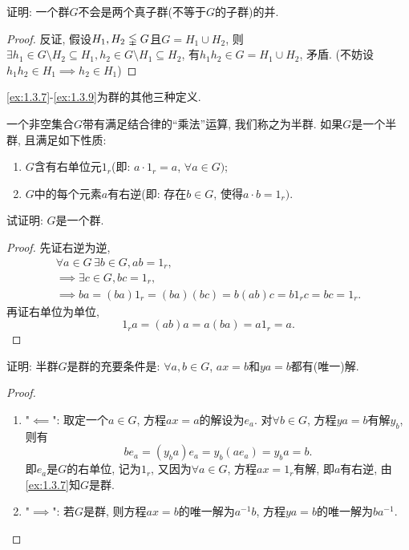 \begin{problem}
    证明: 一个群$G$不会是两个真子群(不等于$G$的子群)的并.
\end{problem}

\begin{proof}
    反证, 假设$H_1, H_2 \lvertneqq G$且$G = H_1 \cup H_2$, 则$\exists h_1 \in G \setminus H_2 \subseteq H_1, h_2 \in G \setminus H_1 \subseteq H_2$, 有$h_1h_2 \in G = H_1 \cup H_2$, 矛盾. (不妨设$h_1h_2 \in H_1 \implies h_2 \in H_1$)
\end{proof}

\ref{ex:1.3.7}-\ref{ex:1.3.9}为群的其他三种定义.

\begin{problem}\label{ex:1.3.7}
    一个非空集合$G$带有满足结合律的“乘法”运算, 我们称之为半群. 如果$G$是一个半群, 且满足如下性质:
    \begin{enumerate}[(1)]
        \item $G$含有右单位元$1_r$(即: $a \cdot 1_r = a$, $\forall a \in G)$;
        \item $G$中的每个元素$a$有右逆(即: 存在$b \in G$, 使得$a \cdot b = 1_r)$.
    \end{enumerate}
    试证明: $G$是一个群.
\end{problem}

\begin{proof}
    先证右逆为逆,
    \[
    \begin{gathered}
        \forall a \in G \, \exists b \in G, ab = 1_r,\\
        \implies \exists c \in G, bc = 1_r,\\
        \implies ba = (ba)1_r = (ba)(bc) = b(ab)c = b1_rc = bc = 1_r.
    \end{gathered}
    \]
    再证右单位为单位,
    \[
        1_ra = (ab)a = a(ba) = a1_r = a.
    \]
\end{proof}

\begin{problem}\label{ex:1.3.8}
    证明: 半群$G$是群的充要条件是: $\forall a, b \in G$, $ax = b$和$ya = b$都有(唯一)解.
\end{problem}

\begin{proof}
\begin{enumerate}[(1)]
    \item "$\impliedby$": 取定一个$a \in G$, 方程$ax = a$的解设为$e_a$. 对$\forall b \in G$, 方程$ya = b$有解$y_b$, 则有
    \[
        be_a = (y_ba)e_a = y_b(ae_a) = y_ba = b.
    \]
    即$e_a$是$G$的右单位, 记为$1_r$, 又因为$\forall a \in G$, 方程$ax = 1_r$有解, 即$a$有右逆, 由\ref{ex:1.3.7}知$G$是群.
    \item "$\implies$": 若$G$是群, 则方程$ax = b$的唯一解为$a^{-1}b$, 方程$ya = b$的唯一解为$ba^{-1}$.
\end{enumerate}
    
\end{proof}

